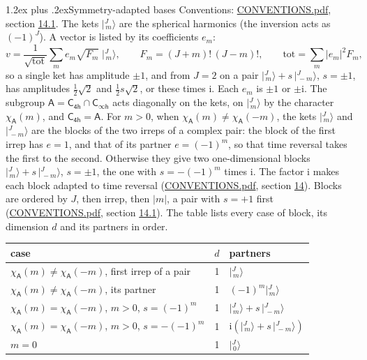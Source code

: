 \documentclass[10pt,a4paper]{article}
\makeatletter
\renewcommand\section{\@startsection{section}{1}{\z@}{-3ex plus -1ex minus -.2ex}%
  {1.2ex plus .2ex}{\normalfont\large\sffamily\bfseries\color{parttitle}}}
\numberwithin{equation}{section}
\newcommand{\grp}[1]{\mathsf{#1}}
\newcommand{\iunit}{\mathrm{i}}
\newcommand{\chiA}{\chi_{\grp{A}}}
\newcommand{\jm}[2]{\bigl\lvert{}^{#1}_{\,#2}\bigr\rangle}
\makeatother
\begin{document}
\section{Symmetry-adapted bases}\label{s:bases}
Conventions: \href{../../CONVENTIONS.pdf}{CONVENTIONS.pdf}, section \href{../../CONVENTIONS.pdf\#conv.14.1}{14.1}.
\leavevmode\label{n:index.m}\label{n:vector.ket}The kets $\jm{J}{m}$ are the spherical harmonics (the inversion acts as $(-1)^J$). \label{n:index.ketcoefficient}\label{n:vector.basis.symmetry}\label{n:index.ketweight}\label{n:index.total}A vector is listed by its coefficients $e_m$:
\begin{equation}\label{e:ket}v = \frac{1}{\sqrt{\mathrm{tot}}}\sum_m e_m\sqrt{F_m}\;\jm{J}{m},\qquad F_m = (J+m)!\,(J-m)!,\qquad \mathrm{tot} = \sum_m |e_m|^2F_m,\end{equation}
\leavevmode\label{n:index.pair.sign}so a single ket has amplitude $\pm1$, and from $J = 2$ on a pair $\jm{J}{m} + s\,\jm{J}{-m}$, $s = \pm1$, has amplitudes $\tfrac{1}{2}\sqrt{2}$ and $\tfrac{1}{2}s\sqrt{2}$, or these times $\iunit$. Each $e_m$ is $\pm1$ or $\pm\iunit$.
\leavevmode\label{n:group.A}\label{n:function.character.abelian}The subgroup $\grp{A} = \grp{C_{4h}}\cap\grp{C_{\infty h}}$ acts diagonally on the kets, on $\jm{J}{m}$ by the character $\chiA(m)$, and $\grp{C_{4h}} = \grp{A}$. For $m > 0$, when $\chiA(m) \ne \chiA(-m)$, the kets $\jm{J}{m}$ and $\jm{J}{-m}$ are the blocks of the two irreps of a complex pair: the block of the first irrep has $e = 1$, and that of its partner $e = (-1)^m$, so that time reversal takes the first to the second. Otherwise they give two one-dimensional blocks $\jm{J}{m} + s\,\jm{J}{-m}$, $s = \pm1$, the one with $s = -(-1)^m$ times $\iunit$. The factor $\iunit$ makes each block adapted to time reversal (\href{../../CONVENTIONS.pdf}{CONVENTIONS.pdf}, section \href{../../CONVENTIONS.pdf\#conv.14}{14}). Blocks are ordered by $J$, then irrep, then $|m|$, a pair with $s = +1$ first (\href{../../CONVENTIONS.pdf}{CONVENTIONS.pdf}, section \href{../../CONVENTIONS.pdf\#conv.14.1}{14.1}).
\leavevmode\label{n:head.case}\label{n:head.partners}The table lists every case of block, its dimension $d$ and its partners in order.
\begin{center}\begin{tabular}{@{}lrl@{}}\toprule
case & $d$ & partners\\\midrule
$\chiA(m) \ne \chiA(-m)$, first irrep of a pair & 1 & $\jm{J}{m}$\\
$\chiA(m) \ne \chiA(-m)$, its partner & 1 & $(-1)^m\jm{J}{m}$\\
$\chiA(m) = \chiA(-m)$, $m > 0$, $s = (-1)^m$ & 1 & $\jm{J}{m} + s\,\jm{J}{-m}$\\
$\chiA(m) = \chiA(-m)$, $m > 0$, $s = -(-1)^m$ & 1 & $\iunit(\jm{J}{m} + s\,\jm{J}{-m})$\\
$m = 0$ & 1 & $\jm{J}{0}$\\
\bottomrule\end{tabular}\end{center}
\end{document}

